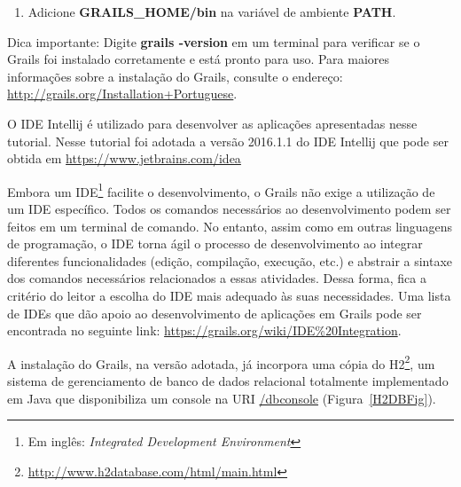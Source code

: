 {\begin{enumerate}
\vspace{0.3cm}
  
  \item Adicione {\bf GRAILS\_HOME/bin} na variável de ambiente {\bf PATH}.

\end{enumerate}

\vspace{0.3cm}

Dica importante: Digite {\bf grails -version} em um terminal para verificar se o
Grails  foi  instalado  corretamente  e  está pronto  para  uso.   Para  maiores
informações sobre a instalação do Grails, consulte o endereço: 
{\footnotesize\url{http://grails.org/Installation+Portuguese}}.  

\vspace{0.5cm}

 O IDE Intellij  é utilizado para desenvolver
as aplicações apresentadas nesse tutorial.   Nesse tutorial foi adotada a versão
2016.1.1  do      IDE Intellij      que      pode      ser      obtida      em
{\footnotesize\url{https://www.jetbrains.com/idea}}

\vspace{0.5cm}

Embora  um  IDE\footnote{Em inglês:  {\it  Integrated Development  Environment}}
facilite  o  desenvolvimento,  o  Grails  não  exige  a  utilização  de  um  IDE
específico.  Todos  os comandos necessários ao desenvolvimento  podem ser feitos
em  um terminal  de comando.   No entanto,  assim como  em outras  linguagens de
programação,  o  IDE  torna  ágil  o processo  de  desenvolvimento  ao  integrar
diferentes funcionalidades  (edição, compilação,  execução, etc.)  e  abstrair a
sintaxe dos comandos necessários  relacionados a essas atividades.  Dessa forma,
fica a critério  do leitor a escolha do IDE mais  adequado às suas necessidades.
Uma lista de IDEs que dão  apoio ao desenvolvimento de aplicações em Grails pode
ser             encontrada             no             seguinte             link:
{\footnotesize\url{https://grails.org/wiki/IDE%20Integration}}. 

\vspace{1cm}

  A instalação do Grails, na
versão        adotada,       já        incorpora       uma        cópia       do
H2\footnote{\url{http://www.h2database.com/html/main.html}},   um   sistema   de
gerenciamento de banco  de dados relacional totalmente implementado  em Java que
disponibiliza um console na URI \url{/dbconsole} (Figura~\ref{H2DBFig}).  

}
